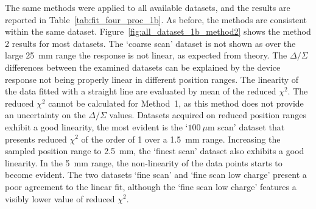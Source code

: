 The same methods were applied to all available datasets, and the results are reported in Table~\ref{tab:fit_four_proc_1b}. As before, the methods are consistent within the same dataset. Figure~\ref{fig:all_dataset_1b_method2} shows the method 2 results for most datasets. The `coarse scan' dataset is not shown as over the large 25~mm range the response is not linear, as expected from theory. The $\Delta/\Sigma$ differences between the examined datasets can be explained by the device response not being properly linear in different position ranges. The linearity of the data fitted with a straight line are evaluated by mean of the reduced $\chi^2$. The reduced $\chi^2$ cannot be calculated for Method~1, as this method does not provide an uncertainty on the $\Delta/\Sigma$ values. Datasets acquired on reduced position ranges exhibit a good linearity, the most evident is the `$100~\mu$m scan' dataset that presents reduced $\chi^2$ of the order of 1 over a 1.5~mm range. Increasing the sampled position range to 2.5~mm, the `finest scan' dataset also exhibits a good linearity. In the 5~mm range, the non-linearity of the data points starts to become evident. The two datasets `fine scan' and `fine scan low charge' present a poor agreement to the linear fit, although the `fine scan low charge' features a visibly lower value of reduced $\chi^2$. 

